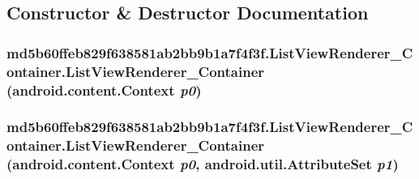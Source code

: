 \subsection{Constructor \& Destructor Documentation}
\hypertarget{classmd5b60ffeb829f638581ab2bb9b1a7f4f3f_1_1_list_view_renderer___container_960e9091cd0ede6811fa2f774ac998a3}{
\subsubsection[{ListViewRenderer\_\-Container}]{\setlength{\rightskip}{0pt plus 5cm}md5b60ffeb829f638581ab2bb9b1a7f4f3f.ListViewRenderer\_\-Container.ListViewRenderer\_\-Container (android.content.Context {\em p0})}}
\label{classmd5b60ffeb829f638581ab2bb9b1a7f4f3f_1_1_list_view_renderer___container_960e9091cd0ede6811fa2f774ac998a3}


\hypertarget{classmd5b60ffeb829f638581ab2bb9b1a7f4f3f_1_1_list_view_renderer___container_079f089bf8a9f4a35ec59ce04abb3d98}{
\subsubsection[{ListViewRenderer\_\-Container}]{\setlength{\rightskip}{0pt plus 5cm}md5b60ffeb829f638581ab2bb9b1a7f4f3f.ListViewRenderer\_\-Container.ListViewRenderer\_\-Container (android.content.Context {\em p0}, \/  android.util.AttributeSet {\em p1})}}
\label{classmd5b60ffeb829f638581ab2bb9b1a7f4f3f_1_1_list_view_renderer___container_079f089bf8a9f4a35ec59ce04abb3d98}


